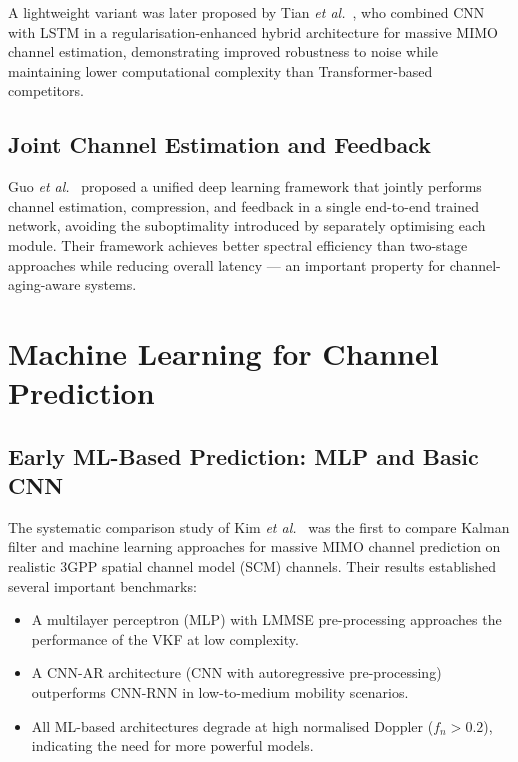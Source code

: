 \documentclass[12pt,a4paper]{article}
\begin{document}
A lightweight variant was later proposed by Tian
\textit{et al.}~\cite{Tian2025hybrid}, who combined CNN with LSTM
in a regularisation-enhanced hybrid architecture for massive MIMO
channel estimation, demonstrating improved robustness to noise while
maintaining lower computational complexity than Transformer-based
competitors.

\subsection{Joint Channel Estimation and Feedback}

Guo \textit{et al.}~\cite{Guo2024joint} proposed a unified deep
learning framework that jointly performs channel estimation,
compression, and feedback in a single end-to-end trained network,
avoiding the suboptimality introduced by separately optimising each
module. Their framework achieves better spectral efficiency than
two-stage approaches while reducing overall latency --- an important
property for channel-aging-aware systems.

\section{Machine Learning for Channel Prediction}

\subsection{Early ML-Based Prediction: MLP and Basic CNN}

The systematic comparison study of Kim \textit{et al.}~\cite{Kim2021kalman}
was the first to compare Kalman filter and machine learning approaches
for massive MIMO channel prediction on realistic 3GPP spatial channel
model (SCM) channels. Their results established several important benchmarks:
\begin{itemize}[nosep]
  \item A multilayer perceptron (MLP) with LMMSE pre-processing
        approaches the performance of the VKF at low complexity.
  \item A CNN-AR architecture (CNN with autoregressive pre-processing)
        outperforms CNN-RNN in low-to-medium mobility scenarios.
  \item All ML-based architectures degrade at high normalised Doppler
        ($f_n > 0.2$), indicating the need for more powerful models.
\end{itemize}
\end{document}
